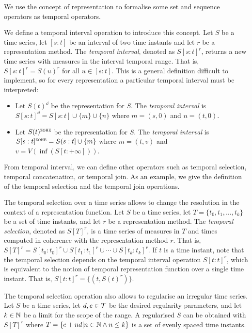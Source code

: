 We use the concept of representation to formalise some set and
sequence operators as temporal operators.

We define a temporal interval operation to introduce this concept.
Let $S$ be a time series, let $[s:t]$ be an interval of two time
instants and let $r$ be a representation method. The \emph{temporal
  interval}, denoted as $S[s:t]^r$, returns a new time series with
measures in the interval temporal range. That is, $S[s:t]^r = S(u)^r$
for all $u \in [s:t]$. This is a general definition difficult to
implement, so for every representation a particular temporal interval
must be interpreted:

\begin{itemize}
\item Let $S(t)^\dd$ be the \dd{} representation for $S$. The
  \emph{\dd{} temporal interval} is $S[s:t]^\dd = S[s:t]
  \cup \{m\} \cup \{n\}$ where $m=(s,0)$ and $n=(t,0)$.

\item Let $S(t)^\zohe{}$ be the \zohe{} representation for $S$. The
  \emph{\zohe{} temporal interval} is $S[s:t]^\zohe{} = S(s:t]
  \cup \{m\}$ where $m=(t,v)$ and $v= V(\inf( S[t:+\infty] ))$.
\end{itemize}

From temporal interval, we can define other operators such as temporal
selection, temporal concatenation, or temporal join. As an example, we
give the definition of the temporal selection and the temporal join
operations.

The temporal selection over a time series allows to change the
resolution in the context of a representation function.  Let $S$ be a
time series, let $T=\{t_0,t_1,\dotsc,t_k\}$ be a set of time instants,
and let $r$ be a representation method. The \emph{temporal selection},
denoted as $S[T]^r$, is a time series of measures in $T$ and times
computed in coherence with the representation method $r$. That is,
$S[T]^r = S[t_0:t_0]^r \cup S[t_1:t_1]^r \cup \dotsb \cup
S[t_k:t_k]^r$. If $t$ is a time instant, note that the temporal
selection depends on the temporal interval operation $S[t:t]^r$, which
is equivalent to the notion of temporal representation function over a
single time instant. That is, $S[t:t]^r = \{ (t, S(t)^r) \}$.

The temporal selection operation also allows to regularise an
irregular time series. Let $S$ be a time series, let $d,e\in\cal{T}$
be the desired regularity parameters, and let $k\in\mathbb{N}$ be a limit for
the scope of the range.  A regularised $S$ can be obtained with
$S[T]^r$ where $T = \{e+nd | n\in\mathbb{N} \wedge n\leq k \}$ is a set of
evenly spaced time instants.


